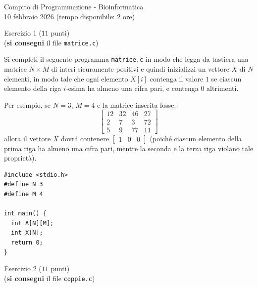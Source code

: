 \documentclass[12pt]{article}
\begin{document}
\begin{center}
  {\LARGE Compito di Programmazione - Bioinformatica}\\
  {10 febbraio 2026 (tempo disponibile: 2 ore)}
\end{center}

\vspace*{1ex}
\begin{center}{\Large Esercizio 1} ($11$ punti)\\
  (\textbf{si consegni} il file \texttt{matrice.c})
\end{center}

Si completi il seguente programma \texttt{matrice.c}
in modo che legga da tastiera una matrice $N\times M$
di interi sicuramente positivi e quindi inizializzi un vettore $X$ di $N$ elementi,
in modo tale che
ogni elemento $X[i]$ contenga il valore $1$ se ciascun elemento della riga $i$-esima
ha almeno una cifra pari, e contenga $0$ altrimenti.

Per esempio, se $N = 3$, $M = 4$ e la matrice inserita fosse:
%
\[
\begin{bmatrix}
  12 & 32 & 46 & 27 \\
  2 & 7 & 3 & 72 \\
  5 & 9 & 77 & 11
\end{bmatrix}
\]
%
allora il vettore $X$ dovr\'a contenere $\begin{bmatrix}1 & 0 & 0\end{bmatrix}$
(poich\'e ciascun elemento della prima riga ha almeno una cifra pari, mentre
la seconda e la terza riga violano tale propriet\`a).
%
\begin{mdframed}[backgroundcolor=verylightgray]
  \begin{lstlisting}[language=myC]
#include <stdio.h>
#define N 3
#define M 4

int main() {
  int A[N][M];
  int X[N];
  return 0;
}
  \end{lstlisting}
\end{mdframed}

\vspace*{1ex}
\begin{center}{\Large Esercizio 2} ($11$ punti)\\
  (\textbf{si consegni} il file \texttt{coppie.c})
\end{center}
\end{document}
